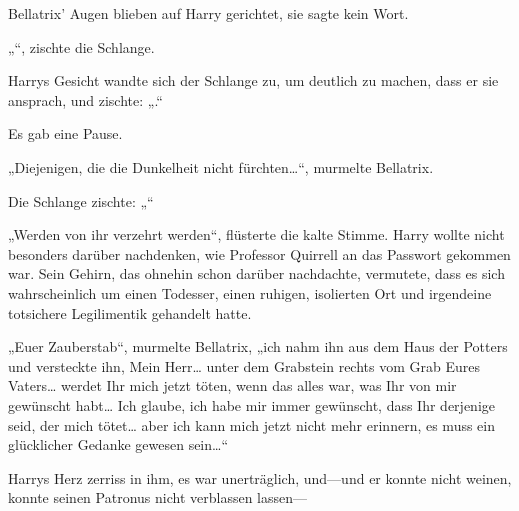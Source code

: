 Bellatrix' Augen blieben auf Harry gerichtet, sie sagte kein Wort.

„“, zischte die Schlange.

Harrys Gesicht wandte sich der Schlange zu, um deutlich zu machen, dass er sie ansprach, und zischte: „.“

Es gab eine Pause.

„Diejenigen, die die Dunkelheit nicht fürchten…“, murmelte Bellatrix.

Die Schlange zischte: „“

„Werden von ihr verzehrt werden“, flüsterte die kalte Stimme. Harry wollte nicht besonders darüber nachdenken, wie Professor Quirrell an das Passwort gekommen war. Sein Gehirn, das ohnehin schon darüber nachdachte, vermutete, dass es sich wahrscheinlich um einen Todesser, einen ruhigen, isolierten Ort und irgendeine totsichere Legilimentik gehandelt hatte.

„Euer Zauberstab“, murmelte Bellatrix, „ich nahm ihn aus dem Haus der Potters und versteckte ihn, Mein Herr… unter dem Grabstein rechts vom Grab Eures Vaters… werdet Ihr mich jetzt töten, wenn das alles war, was Ihr von mir gewünscht habt… Ich glaube, ich habe mir immer gewünscht, dass Ihr derjenige seid, der mich tötet… aber ich kann mich jetzt nicht mehr erinnern, es muss ein glücklicher Gedanke gewesen sein…“

Harrys Herz zerriss in ihm, es war unerträglich, und—und er konnte nicht weinen, konnte seinen Patronus nicht verblassen lassen—

